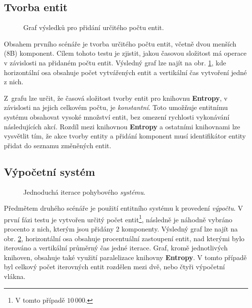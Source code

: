 \subsection{Tvorba entit}

\begin{figure}[H]
	\begin{center}
	\end{center}
	\caption{Graf výsledků pro přidání určitého počtu entit.}
	\label{Fig:EVALEntity}
\end{figure}

Obsahem prvního scénáře je tvorba určitého počtu entit, včetně dvou menších (8B) komponent. Cílem tohoto testu je zjistit, jakou časovou složitost má operace v závislosti na přidaném počtu entit. Výsledný graf lze najít na obr. \ref{Fig:EVALEntity}, kde horizontální osa obsahuje počet vytvářených entit a vertikální čas vytvoření jedné z nich. 

Z~grafu lze určit, že časová složitost tvorby entit pro knihovnu \textbf{Entropy}, v závislosti na jejich celkovém počtu, je \emph{konstantní}. Toto umožňuje entitnímu systému obsahovat vysoké množství entit, bez omezení rychlosti vykonávání následujících akcí. Rozdíl mezi knihovnou \textbf{Entropy} a ostatními knihovnami lze vysvětlit tím, že akce tvorby entity a přidání komponent musí identifikátor entity přidat do seznamu změněných entit.

\subsection{Výpočetní systém}

\begin{figure}[H]
	\begin{center}
	\end{center}
	\caption{Jednoduchá iterace pohybového \emph{systému}.}
	\label{Fig:EVALMovSys}
\end{figure}

Předmětem druhého scénáře je použití entitního systému k provedení \emph{výpočtu}. V první fázi testu je vytvořen určitý počet entit\footnote{V tomto případě $10\,000$.}, následně je náhodně vybráno procento z nich, kterým jsou přidány 2 komponenty. Výsledný graf lze najít na obr. \ref{Fig:EVALMovSys}, horizontální osa obsahuje procentuální zastoupení entit, nad kterými bylo iterováno a vertikální průměrný čas jedné iterace. Graf, kromě jednotlivých knihoven, obsahuje také využití paralelizace knihovny \textbf{Entropy}. V tomto případě byl celkový počet iterovných entit rozdělen mezi dvě, nebo čtyři výpočetní vlákna. 

